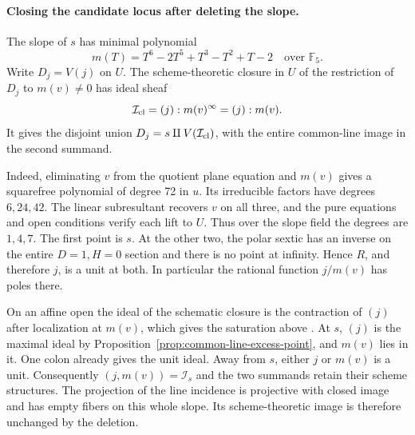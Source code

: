 \paragraph{Closing the candidate locus after deleting the slope.}
The slope of \(s\) has minimal polynomial
\[
      m(T)=T^6-2T^5+T^3-T^2+T-2\quad\text{over }\mathbb F_5.
\]
Write \(D_j=V(j)\) on \(U\). The scheme-theoretic closure in \(U\) of
the restriction of \(D_j\) to \(m(v)\ne0\) has ideal sheaf
\[
    \mathcal I_{\rm cl}=(j):m(v)^\infty=(j):m(v).
\]
It gives the disjoint union \(D_j=s\amalg V(\mathcal I_{\rm cl})\),
with the entire common-line image in the second summand.

Indeed, eliminating \(v\) from the quotient plane equation and
\(m(v)\) gives a squarefree polynomial of degree 72 in \(u\). Its
irreducible factors have degrees \(6,24,42\). The linear subresultant
recovers \(v\) on all three, and the pure equations and open
conditions verify each lift to \(U\). Thus over the slope field the
degrees are \(1,4,7\). The first point is \(s\). At the other two,
the polar sextic has an inverse on the entire \(D=1,H=0\) section
and there is no point at infinity. Hence \(R\), and therefore \(j\),
is a unit at both. In particular the rational function \(j/m(v)\)
has poles there.

On an affine open the ideal of the schematic closure is the contraction
of \((j)\) after localization at \(m(v)\), which gives the saturation
above \cite{stacksSchemeImage}. At \(s\), \((j)\) is the maximal ideal
by Proposition~\ref{prop:common-line-excess-point}, and \(m(v)\) lies
in it. One colon already gives the unit ideal. Away from \(s\), either
\(j\) or \(m(v)\) is a unit. Consequently \((j,m(v))=\mathcal I_s\)
and the two summands retain their scheme structures. The projection
of the line incidence is projective with closed image and has empty
fibers on this whole slope. Its scheme-theoretic image is therefore
unchanged by the deletion.


